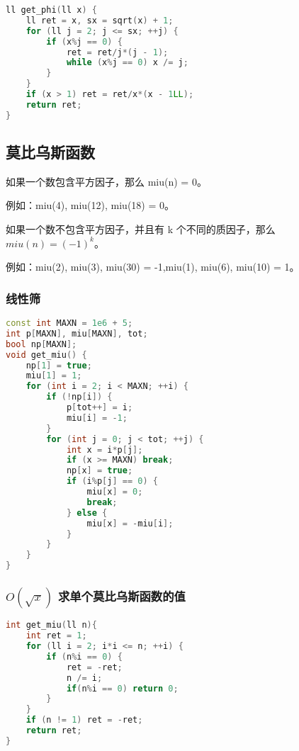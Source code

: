 \begin{lstlisting}[language=C++]
ll get_phi(ll x) {
    ll ret = x, sx = sqrt(x) + 1;
    for (ll j = 2; j <= sx; ++j) {
        if (x%j == 0) {
            ret = ret/j*(j - 1);
            while (x%j == 0) x /= j;
        }
    }
    if (x > 1) ret = ret/x*(x - 1LL);
    return ret;
}
\end{lstlisting}

\subsection{莫比乌斯函数}


如果一个数包含平方因子，那么 miu(n) = 0。

例如：miu(4), miu(12), miu(18) = 0。

如果一个数不包含平方因子，并且有 k 个不同的质因子，那么 $miu(n) = (-1)^k$。

例如：miu(2), miu(3), miu(30) = -1,miu(1), miu(6), miu(10) = 1。

\subsubsection{线性筛}

\begin{lstlisting}[language=C++]
const int MAXN = 1e6 + 5;
int p[MAXN], miu[MAXN], tot;
bool np[MAXN];
void get_miu() {
    np[1] = true;
    miu[1] = 1;
    for (int i = 2; i < MAXN; ++i) {
        if (!np[i]) {
            p[tot++] = i;
            miu[i] = -1;
        }
        for (int j = 0; j < tot; ++j) {
            int x = i*p[j];
            if (x >= MAXN) break;
            np[x] = true;
            if (i%p[j] == 0) {
                miu[x] = 0;
                break;
            } else {
                miu[x] = -miu[i];
            }
        }
    }
}
\end{lstlisting}

\subsubsection{$O(\sqrt{x})$ 求单个莫比乌斯函数的值}

\begin{lstlisting}[language=C++]
int get_miu(ll n){
    int ret = 1;
    for (ll i = 2; i*i <= n; ++i) {
        if (n%i == 0) {
            ret = -ret;
            n /= i;
            if(n%i == 0) return 0;
        }
    }
    if (n != 1) ret = -ret;
    return ret;
}
\end{lstlisting}

